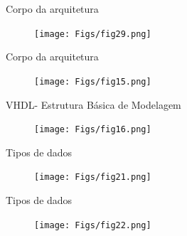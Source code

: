 \documentclass[aspectratio=169]{beamer}
\begin{document}
\begin{frame}{Corpo da arquitetura}
	\justifying
	
	
	\begin{figure}[h]
		\centering
		\texttt{[image: Figs/fig29.png]}
	\end{figure}
	
	
	
\end{frame}
\begin{frame}{Corpo da arquitetura}
	\justifying
	
	
	\begin{figure}[h]
		\centering
		\texttt{[image: Figs/fig15.png]}
	\end{figure}
	
	
	
\end{frame}
\begin{frame}{VHDL- Estrutura Básica de Modelagem}
	\justifying
	
	
	\begin{figure}[h]
		\centering
		\texttt{[image: Figs/fig16.png]}
	\end{figure}
	
	
	
\end{frame}
\begin{frame}{Tipos de dados}
	\justifying

	\begin{figure}[h]
		\centering
		\texttt{[image: Figs/fig21.png]}
	\end{figure}

\end{frame}
\begin{frame}{Tipos de dados}
	\justifying
	
	
	\begin{figure}[h]
		\centering
		\texttt{[image: Figs/fig22.png]}
	\end{figure}	
	
\end{frame}
\end{document}
